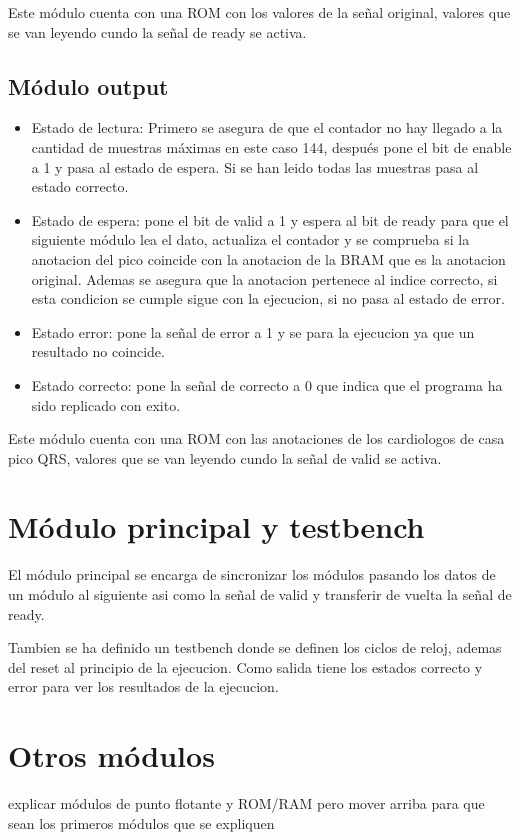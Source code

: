 Este módulo cuenta con una ROM con los valores de la señal original, valores que se van leyendo cundo la señal de ready se activa.

\subsection{Módulo output}
\begin{itemize}
    \item Estado de lectura: Primero se asegura de que el contador no hay llegado a la cantidad de muestras máximas en este caso 144, después pone el bit de enable a 1 
    y pasa al estado de espera. Si se han leido todas las muestras pasa al estado correcto.
    \item Estado de espera: pone el bit de valid a 1 y espera al bit de ready para que el siguiente módulo lea el dato, actualiza el contador y se comprueba si la anotacion
    del pico coincide con la anotacion de la BRAM que es la anotacion original. Ademas se asegura que la anotacion pertenece al indice correcto, si esta condicion se cumple
    sigue con la ejecucion, si no pasa al estado de error.
    \item Estado error: pone la señal de error a 1 y se para la ejecucion ya que un resultado no coincide.
    \item Estado correcto: pone la señal de correcto a 0 que indica que el programa ha sido replicado con exito.
\end{itemize}

Este módulo cuenta con una ROM con las anotaciones de los cardiologos de casa pico QRS, valores que se van leyendo cundo la señal de valid se activa.

\section{Módulo principal y testbench}

El módulo principal se encarga de sincronizar los módulos pasando los datos de un módulo al siguiente asi como la señal de valid y transferir de vuelta la señal de ready.

Tambien se ha definido un testbench donde se definen los ciclos de reloj, ademas del reset al principio de la ejecucion. Como salida tiene los estados correcto y error para 
ver los resultados de la ejecucion.

\section{Otros módulos} 
explicar módulos de punto flotante y ROM/RAM pero mover
arriba para que sean los primeros módulos que se expliquen
